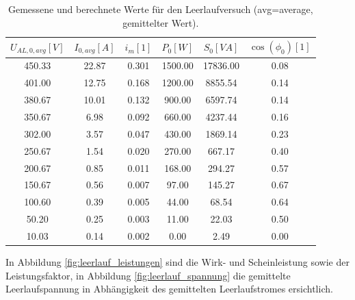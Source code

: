 \begin{table}[htb]
     \begin{center}
\begin{tabular}{|c|c|c|c|c|c|}
     \hline
     $U_{AL,0,avg} [\si{V}]$ & $I_{0,avg} [\si{A}]$ & $i_{m} [1]$ & $P_0 [\si{W}]$ & $S_0 [\si{VA}]$ & $\cos{(\phi_0)} [1]$ \\
     \hline \hline
     450.33 & 22.87 & 0.301 & 1500.00 & 17836.00 & 0.08\\ \hline
     401.00 & 12.75 & 0.168 & 1200.00 & 8855.54 & 0.14\\ \hline
     380.67 & 10.01 & 0.132 & 900.00 & 6597.74 & 0.14\\ \hline
     350.67 & 6.98 & 0.092 & 660.00 & 4237.44 & 0.16\\ \hline
     302.00 & 3.57 & 0.047 & 430.00 & 1869.14 & 0.23\\ \hline
     250.67 & 1.54 & 0.020 & 270.00 & 667.17 & 0.40\\ \hline
     200.67 & 0.85 & 0.011 & 168.00 & 294.27 & 0.57\\ \hline
     150.67 & 0.56 & 0.007 & 97.00 & 145.27 & 0.67\\ \hline
     100.60 & 0.39 & 0.005 & 44.00 & 68.54 & 0.64\\ \hline
     50.20 & 0.25 & 0.003 & 11.00 & 22.03 & 0.50\\ \hline
     10.03 & 0.14 & 0.002 & 0.00 & 2.49 & 0.00\\
     \hline
\end{tabular}
\end{center}
\label{tab:leerlauf_werte}
\caption{Gemessene und berechnete Werte für den Leerlaufversuch (avg=average, gemittelter Wert).}
\end{table}

\noindent In Abbildung \ref{fig:leerlauf_leistungen} sind die Wirk- und Scheinleistung sowie der Leistungsfaktor, in Abbildung \ref{fig:leerlauf_spannung} die gemittelte Leerlaufspannung in Abhängigkeit des gemittelten Leerlaufstromes ersichtlich.




